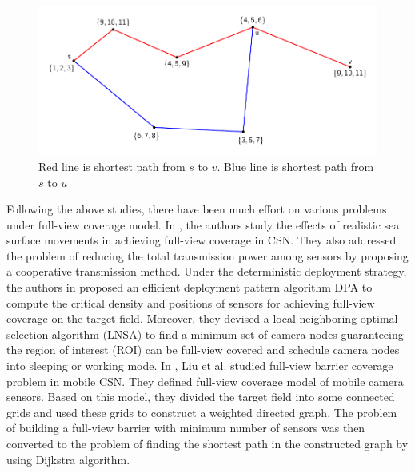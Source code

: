 \begin{figure}[p]
	\centering
	\includegraphics[scale=1.]{wrongDijstra.pdf}
	\caption{Red line is shortest path from $s$ to $v$. Blue line is shortest path from $s$ to $u$}
	\label{fig:01}
\end{figure}

Following the above studies, there have been much effort on various problems under full-view coverage model. In \cite{manoufali2016effect}, the authors study the effects of realistic sea surface movements in achieving full-view coverage in CSN. They also addressed the problem of reducing the total transmission power among sensors by proposing a cooperative transmission method. Under the deterministic deployment strategy, the authors in \cite{wu2017node} proposed an efficient deployment pattern algorithm DPA to compute the critical density and positions of sensors for achieving full-view coverage on the target field. Moreover, they devised a local neighboring-optimal selection algorithm (LNSA) to find a minimum set of camera nodes guaranteeing the region of interest (ROI) can be full-view covered and schedule camera nodes into sleeping or working mode. In \cite{liu2018full}, Liu et al. studied full-view barrier coverage problem in mobile CSN. They defined full-view coverage model of mobile camera sensors. Based on this model, they divided the target field into some connected grids and used these grids to construct a weighted directed graph. The problem of building a full-view barrier with minimum number of sensors was then converted to the problem of finding the shortest path in the constructed graph by using Dijkstra algorithm.\par
	
